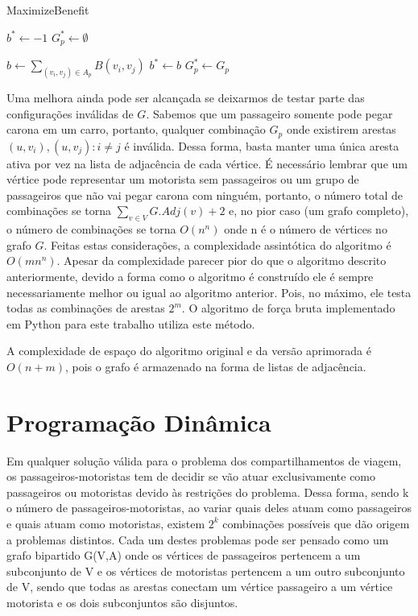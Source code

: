 \documentclass{article}
\begin{document}
\begin{algorithm}
\caption{MaximizeBenefit}
\begin{algorithmic}[1]

\State $ b^* \gets -1 $
\State $ G_p^* \gets \emptyset $
\item {}

  \State $ \textit{b} \gets \sum_{(v_i, v_j) \in A_p} B(v_i, v_j) $
    \State $ b^* \gets b $
    \State $ G_p^* \gets G_p $
  \EndIf
\EndIf
\EndFor
\EndProcedure
\end{algorithmic}
\label{alg:alg_1}
\end{algorithm}

Uma melhora ainda pode ser alcançada se deixarmos de testar parte das configurações inválidas de $ G $. Sabemos que 
um passageiro somente pode pegar carona em um carro, portanto, qualquer combinação $ G_p $ onde existirem arestas $ (u, v_i), (u, v_j) : i \neq j $
é inválida. Dessa forma, basta manter uma única aresta ativa por vez na lista de adjacência de cada vértice. É necessário lembrar 
que um vértice pode representar um motorista sem passageiros ou um grupo de passageiros que não vai pegar carona com ninguém, 
portanto, o número total de combinações se torna $ \sum_{v \in V} G.Adj(v) + 2 $ e, no pior caso (um grafo completo), 
o número de combinações se torna $ O(n^n) $ onde n é o número de vértices no grafo $ G $. 
Feitas estas considerações, a complexidade assintótica do algoritmo é $ O(mn^n) $. Apesar da complexidade parecer 
pior do que o algoritmo descrito anteriormente, devido a forma como o algoritmo é construído ele é sempre necessariamente
melhor ou igual ao algoritmo anterior. Pois, no máximo, ele testa todas as combinações de arestas $ 2^m $.
O algoritmo de força bruta implementado em Python para este trabalho utiliza este método.

A complexidade de espaço do algoritmo original e da versão aprimorada é $ O(n + m) $, pois o grafo é armazenado na forma de listas de adjacência.

\section{Programação Dinâmica}

Em qualquer solução válida para o problema dos compartilhamentos de viagem, os passageiros-motoristas tem de decidir se vão
atuar exclusivamente como passageiros ou motoristas devido às restrições do problema. Dessa forma, sendo k o número de passageiros-motoristas, 
ao variar quais deles atuam como passageiros e quais atuam como motoristas, existem $ 2^k $ combinações possíveis que dão origem a problemas distintos. 
Cada um destes problemas pode ser pensado como um grafo bipartido G(V,A) onde os vértices de passageiros pertencem a um subconjunto de V e os vértices 
de motoristas pertencem a um outro subconjunto de V, sendo que todas as arestas conectam um vértice passageiro a um vértice motorista e os dois subconjuntos
são disjuntos.
\end{document}
